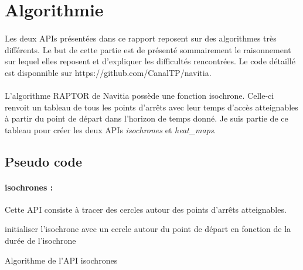 \documentclass[a4paper]{report}
\begin{document}
\section{Algorithmie}

\paragraph{} Les deux APIs présentées dans ce rapport reposent sur des algorithmes très différents. Le but de cette partie est de présenté sommairement le raisonnement sur lequel elles reposent et d'expliquer les difficultés rencontrées. Le code détaillé est disponnible sur \color{blue} https://github.com/CanalTP/navitia. 

\color{black}
\paragraph{}L'algorithme RAPTOR de Navitia possède une fonction isochrone. Celle-ci renvoit un tableau de tous les points d'arrêts avec leur temps d'accès atteignables à partir du point de départ dans l'horizon de temps donné. Je suis partie de ce tableau pour créer les deux APIs \emph{isochrones} et \emph{heat\_maps}.

\subsection{Pseudo code}

\paragraph{isochrones :} Cette API consiste à tracer des cercles autour des points d'arrêts atteignables.
\newline

\begin{algorithm}[H]
 initialiser l'isochrone avec un cercle autour du point de départ en fonction de la durée de l'isochrone\;
 \caption{Algorithme de l'API isochrones}
\end{algorithm}
\end{document}
